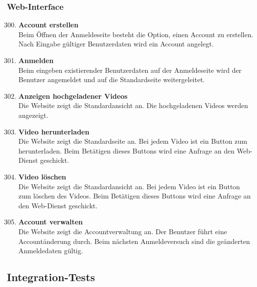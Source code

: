 \subsubsection{\gls{Web-Interface}}
\begin{enumerate}[\bfseries{T}10]  
\setcounter{enumi}{299}{}
\item \textbf{Account erstellen} \hfill\\
Beim \"Offnen der Anmeldeseite besteht die Option, einen Account zu erstellen. Nach Eingabe g\"ultiger Benutzerdaten wird ein Account angelegt.

\item \textbf{Anmelden} \hfill\\
Beim eingeben existierender Benutzerdaten auf der Anmeldeseite wird der Benutzer angemeldet und auf die Standardseite weitergeleitet.

\item \textbf{Anzeigen hochgeladener Videos} \hfill\\
Die Website zeigt die Standardansicht an. Die hochgeladenen Videos werden angezeigt. 

\item \textbf{Video herunterladen} \hfill\\
Die Website zeigt die Standardseite an. Bei jedem Video ist ein Button zum herunterladen. Beim Bet\"atigen dieses Buttons wird eine Anfrage an den Web-Dienst geschickt.

\item \textbf{Video l\"oschen} \hfill\\
Die Website zeigt die Standardansicht an. Bei jedem Video ist ein Button zum l\"oschen des Videos. Beim Bet\"atigen dieses Buttons wird eine Anfrage an den Web-Dienst geschickt.

\item \textbf{Account verwalten} \hfill\\
Die Website zeigt die Accountverwaltung an. Der Benutzer f\"uhrt eine Account\"anderung durch. Beim n\"achsten Anmeldeversuch sind die ge\"anderten Anmeldedaten g\"ultig.

\end{enumerate}


\subsection{Integration-Tests}
